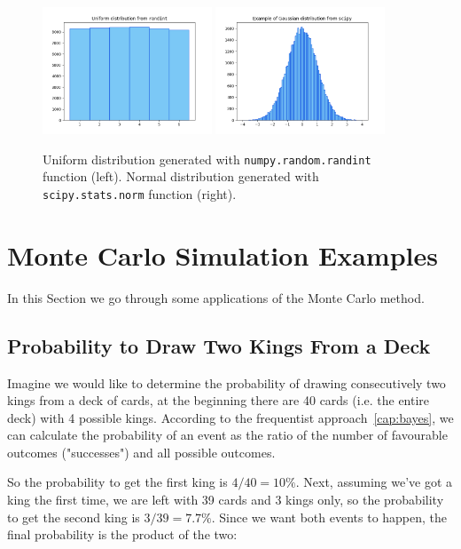 \begin{figure}[hb]
\centering
\includegraphics[width=0.45\textwidth]{figures/uniform}
\includegraphics[width=0.45\textwidth]{figures/standard_normal}
\caption{Uniform distribution generated with \texttt{numpy.random.randint} function (left). Normal distribution generated with \texttt{scipy.stats.norm} function (right).}
\label{fig:gauss_dist}
\end{figure}

\section{Monte Carlo Simulation Examples}
\label{example-of-monte-carlo-simulation}

In this Section we go through some applications of the Monte Carlo method.

\subsection{Probability to Draw Two Kings From a Deck}

Imagine we would like to determine the probability of drawing consecutively two kings from a deck of cards, at the beginning there are 40 cards (i.e. the entire deck) with 4 possible kings. According to the frequentist approach~\ref{cap:bayes}, we can calculate the probability of an event as the ratio of the number of favourable outcomes ("successes") and all possible outcomes. 

So the probability to get the first king is $4/40=10\%$. Next, assuming we've got a king the first time, we are left with 39 cards and 3 kings only, so the probability to get the second king is $3/39=7.7\%$. Since we want both events to happen, the final probability is the product of the two:

